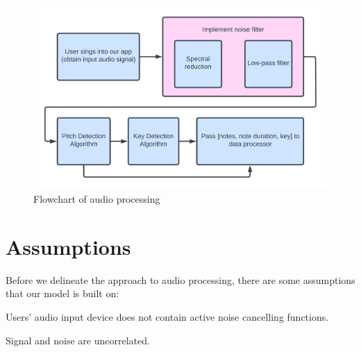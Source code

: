 

\begin{figure}
    \centering
    \includegraphics[width=0.8\columnwidth]{Figures/Audio Processing Flow Chart}
    \decoRule
    \caption{Flowchart of audio processing}
    \label{flowchart}
\end{figure}
\section{Assumptions}
\label{sec:asm}
Before we delineate the approach to audio processing, there are some assumptions that our model
is built on:

\begin{assumption}\label{as:1}
    Users' audio input device does not contain active noise cancelling functions.
\end{assumption}

\begin{assumption}\label{as:2}
    Signal and noise are uncorrelated.
\end{assumption}

